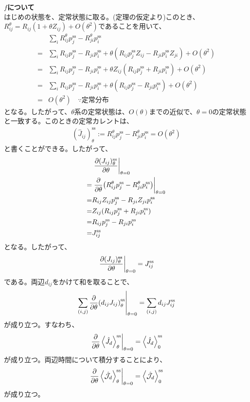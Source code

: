 \documentclass[a4paper,11pt]{jsarticle}
\numberwithin{equation}{section}
\begin{document}
\textbf{$f$について}\\
はじめの状態を、定常状態に取る。(定理の仮定より)このとき、$R_{ij} ^{\theta} = R_{ij}(1+\theta Z_{ij}) + O(\theta^2)$であることを用いて、
\begin{align}
    &\sum_{i}R_{ij}^{\theta} p_j^\text{ss} - R_{ji}^{\theta} p_i^\text{ss} \\
    =& \sum_{i}R_{ij} p_j^\text{ss} - R_{ji} p_i^\text{ss} + \theta (R_{ij} p_j^\text{ss} Z_{ij} - R_{ji} p_i^\text{ss} Z_{ji}) + O(\theta^2)\\
    =& \sum_{i}R_{ij} p_j^\text{ss} - R_{ji} p_i^\text{ss} + \theta Z_{ij}(R_{ij} p_j^\text{ss} + R_{ji} p_i^\text{ss}) + O(\theta^2)\\
    =& \sum_{i}R_{ij} p_j^\text{ss} - R_{ji} p_i^\text{ss} + \theta  (R_{ij} p_j^\text{ss} - R_{ji} p_i^\text{ss}) + O(\theta^2)\\
    =& O(\theta^2) \quad \because \text{定常分布}
\end{align}
となる。したがって、$\theta$系の定常状態は、$O(\theta)$までの近似で、$\theta = 0$の定常状態と一致する。このときの定常カレントは、
\begin{align}
   (\hat{J}_{ij})_\theta^{\text{ss}}:= R_{ij}^\theta p_j^\text{ss} - R_{ji}^\theta p_i^\text{ss} = O(\theta^2)
\end{align}
と書くことができる。したがって、
\begin{align}
    &\eval{\pdv{({{{J}}_{ij}})^{\text{ss}}_\theta}{\theta}}_{\theta = 0} \\
    =& \eval{\pdv{\theta} (R_{ij}^\theta p_j^\text{ss} - R_{ji}^\theta p_i^\text{ss})}_{\theta = 0} \\
    =&  R_{ij} Z_{ij} p_j^\text{ss} - R_{ji} Z_{ji} p_i^\text{ss} \\
    =&  Z_{ij} (R_{ij} p_j^\text{ss} + R_{ji} p_i^\text{ss}) \\
    =&  R_{ij}p_j^\text{ss} - R_{ji}p_i^\text{ss} \\
    =& {J}_{ij}^\text{ss}
\end{align}
となる。したがって、
\begin{align}
    \eval{\pdv{({{J}_{ij}})^{\text{ss}}_\theta}{\theta}}_{\theta = 0} = {J}_{ij}^{\text{ss}}
\end{align}
である。両辺$d_{ij}$をかけて和を取ることで、
\begin{align}
    \left.\sum_{(i,j)} \pdv{\theta} ({d_{ij}{J}_{ij}})^{\text{ss}}_\theta \right|_{\theta = 0} = \sum_{(i,j)} d_{ij} {J}_{ij}^{\text{ss}}
\end{align}
が成り立つ。すなわち、
\begin{align}
    \left.\pdv{\theta} \ev{\hat{{J}}_{d}}^{\text{ss}}_\theta\right|_{\theta = 0} = \ev{\hat{{J}}_{d}}^{\text{ss}}_{0}
\end{align}
が成り立つ。両辺時間について積分することにより、
\begin{align}
    \left.\pdv{\theta} \ev{\hat{{\mathcal{J}}_{d}}}^{\text{ss}}_\theta\right|_{\theta = 0} = \ev{\hat{{\mathcal{J}}_{d}}}^{\text{ss}}_{0}
\end{align}
が成り立つ。
\end{document}
